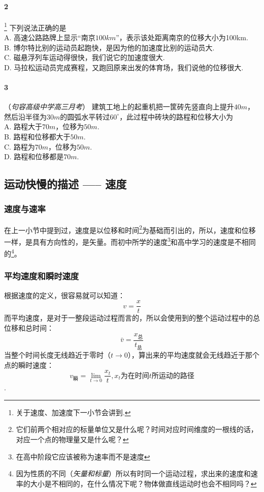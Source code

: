 				\paragraph{2}\footnote{关于速度、加速度下一小节会讲到.}
					下列说法正确的是\mathc\\
					A. 高速公路路牌上显示“南京$100 km$”，表示该处距离南京的位移大小为100km.\\
					B. 博尔特比别的运动员起跑快，是因为他的加速度比别的运动员大.\\
					C. 磁悬浮列车运动得很快，我们说它的加速度很大.\\
					D. 马拉松运动员完成赛程，又跑回原来出发的体育场，我们说他的位移很大.\\
				\paragraph{3}（\emph{句容高级中学高三月考}）
					建筑工地上的起重机把一筐砖先竖直向上提升$40 m$，然后沿半径为$30 m$的圆弧水平转过$60^\circ$，此过程中砖块的路程和位移大小为\mathc\\
					A. 路程大于$70 m$，位移为$50m$.\\
					B. 路程和位移都大于$50 m$.\\
					C. 路程为$70 m$，位移为$50 m$.\\
					D. 路程和位移都是$70 m$.\\
		\subsection{运动快慢的描述 ----- 速度}
			\subsubsection*{速度与速率}
				在上一小节中提到过，速度是以位移和时间\footnote{它们前两个相对应的标量单位又是什么呢？时间对应时间维度的一根线的话，对应一个点的物理量又是什么呢？}为基础而引出的，所以，速度和位移一样，是具有方向性的，是矢量。而初中所学的速度\footnote{在高中阶段它应该被称为速率而不是速度}和高中学习的速度是不相同的\footnote{因为性质的不同（\emph{矢量和标量}）所以有时同一个运动过程，求出来的速度和速率的大小是不相同的，在什么情况下呢？物体做直线运动时也会不相同吗？}。
			\subsubsection*{平均速度和瞬时速度}
				根据速度的定义，很容易就可以知道：$$v=\frac{x}{t}$$
					而平均速度，是对于一整段运动过程而言的，所以会使用到的整个运动过程中的总位移和总时间：$$\bar{v}=\frac{x_\text{总}}{t_\text{总}}$$
				当整个时间长度无线趋近于零时（$t\to 0$），算出来的平均速度就会无线趋近于那个点的瞬时速度：$$v_瞬=\lim_{t\to 0}\frac{x_t}{t},x_t\text{为在时间}t\text{所运动的路径}$$.

